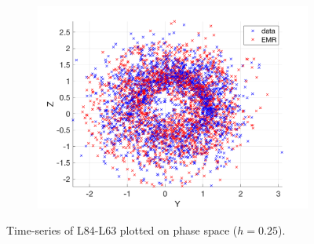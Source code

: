 \documentclass[12pt]{article}
\begin{document}
\begin{figure}[H]
\begin{subfigure}[b]{0.3\textwidth}
		\includegraphics[width=\textwidth]{plots/l84l63/traj3l84.png}
	\end{subfigure}
	\caption{Time-series of L84-L63 plotted on phase space ($h=0.25$).}
\end{figure}
\end{document}
